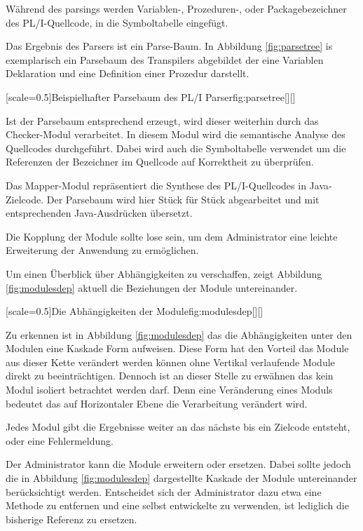 Während des parsings werden Variablen-, Prozeduren-, oder Packagebezeichner des PL/I-Quellcode, in die Symboltabelle eingefügt. 

Das Ergebnis des Parsers ist ein Parse-Baum. 
In Abbildung \ref{fig:parsetree} is exemplarisch ein Parsebaum des Transpilers abgebildet der eine Variablen Deklaration und eine Definition einer Prozedur darstellt.

[scale=0.5]{Beispielhafter Parsebaum des PL/I Parser}{fig:parsetree}[][]

Ist der Parsebaum entsprechend erzeugt, wird dieser weiterhin durch das Checker-Modul verarbeitet. In diesem Modul wird die semantische Analyse des Quellcodes durchgeführt. Dabei wird auch die Symboltabelle verwendet um die Referenzen der Bezeichner im Quellcode auf Korrektheit zu überprüfen.

Das Mapper-Modul repräsentiert die Synthese des PL/I-Quellcodes in Java-Zielcode. Der Parsebaum wird hier Stück für Stück abgearbeitet und mit entsprechenden Java-Ausdrücken übersetzt.

Die Kopplung der Module sollte lose sein, um dem Administrator eine leichte Erweiterung der Anwendung zu ermöglichen.

Um einen Überblick über Abhängigkeiten zu verschaffen, zeigt
Abbildung \ref{fig:modulesdep} aktuell die Beziehungen der Module untereinander.

[scale=0.5]{Die Abhängigkeiten der Module}{fig:modulesdep}[][]
\pagebreak

Zu erkennen ist in Abbildung \ref{fig:modulesdep} das die Abhängigkeiten unter den Modulen eine Kaskade Form aufweisen.
Diese Form hat den Vorteil das Module aus dieser Kette verändert werden können ohne Vertikal verlaufende Module direkt zu beeinträchtigen.
Dennoch ist an dieser Stelle zu erwähnen das kein Modul isoliert betrachtet werden darf. Denn eine Veränderung eines Moduls bedeutet das auf Horizontaler 
Ebene die Verarbeitung verändert wird.

Jedes Modul gibt die Ergebnisse weiter an das nächste bis ein Zielcode entsteht, oder eine Fehlermeldung.

Der Administrator kann die Module erweitern oder ersetzen.
Dabei sollte jedoch die in Abbildung \ref{fig:modulesdep} dargestellte Kaskade der Module untereinander berücksichtigt werden.
Entscheidet sich der Administrator dazu etwa eine Methode zu entfernen und eine selbst entwickelte zu verwenden, ist lediglich die bisherige 
Referenz zu ersetzen.

